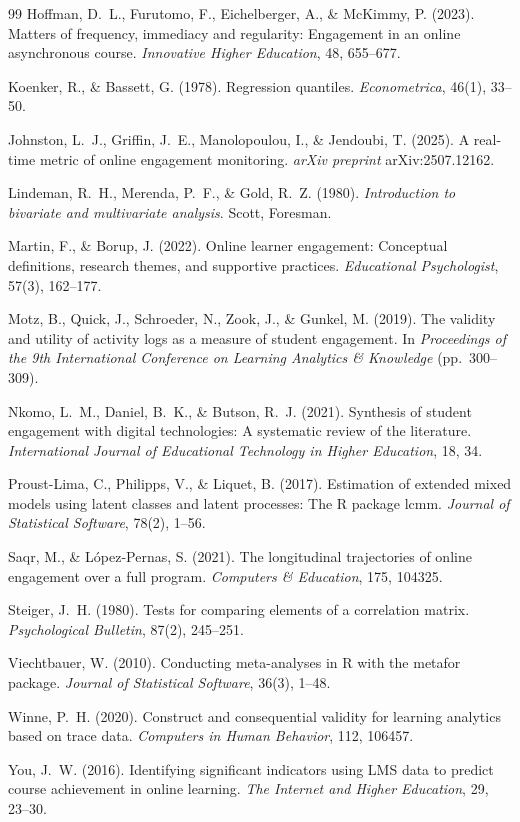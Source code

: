 \documentclass[11pt,a4paper]{article}
\begin{document}
\begin{thebibliography}{99}
Hoffman, D.~L., Furutomo, F., Eichelberger, A., \& McKimmy, P. (2023). Matters
of frequency, immediacy and regularity: Engagement in an online asynchronous
course. \textit{Innovative Higher Education}, 48, 655--677.

Koenker, R., \& Bassett, G. (1978). Regression quantiles.
\textit{Econometrica}, 46(1), 33--50.

Johnston, L.~J., Griffin, J.~E., Manolopoulou, I., \& Jendoubi, T. (2025). A
real-time metric of online engagement monitoring. \textit{arXiv preprint}
arXiv:2507.12162.

Lindeman, R.~H., Merenda, P.~F., \& Gold, R.~Z. (1980). \textit{Introduction to
bivariate and multivariate analysis}. Scott, Foresman.

Martin, F., \& Borup, J. (2022). Online learner engagement: Conceptual
definitions, research themes, and supportive practices. \textit{Educational
Psychologist}, 57(3), 162--177.

Motz, B., Quick, J., Schroeder, N., Zook, J., \& Gunkel, M. (2019). The validity
and utility of activity logs as a measure of student engagement. In
\textit{Proceedings of the 9th International Conference on Learning Analytics
\& Knowledge} (pp.~300--309).

Nkomo, L.~M., Daniel, B.~K., \& Butson, R.~J. (2021). Synthesis of student
engagement with digital technologies: A systematic review of the literature.
\textit{International Journal of Educational Technology in Higher Education},
18, 34.

Proust-Lima, C., Philipps, V., \& Liquet, B. (2017). Estimation of extended mixed
models using latent classes and latent processes: The R package lcmm.
\textit{Journal of Statistical Software}, 78(2), 1--56.

Saqr, M., \& López-Pernas, S. (2021). The longitudinal trajectories of online
engagement over a full program. \textit{Computers \& Education}, 175, 104325.

Steiger, J.~H. (1980). Tests for comparing elements of a correlation matrix.
\textit{Psychological Bulletin}, 87(2), 245--251.

Viechtbauer, W. (2010). Conducting meta-analyses in R with the metafor package.
\textit{Journal of Statistical Software}, 36(3), 1--48.

Winne, P.~H. (2020). Construct and consequential validity for learning analytics
based on trace data. \textit{Computers in Human Behavior}, 112, 106457.

You, J.~W. (2016). Identifying significant indicators using LMS data to predict
course achievement in online learning. \textit{The Internet and Higher
Education}, 29, 23--30.
\end{thebibliography}
\end{document}
